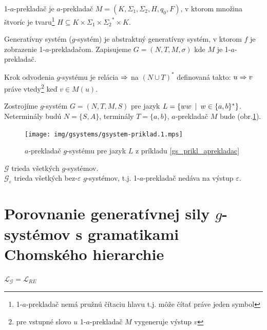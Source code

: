 \begin{definicia}
1-$a$-prekladač je $a$-prekladač
$M=(K,\Sigma_1,\Sigma_2,H,q_0,F)$, v ktorom množina štvoríc je
tvaru\footnote{1-$a$-prekladač nemá pružnú čítaciu hlavu t.j. môže
čítať práve jeden symbol} $H\subseteq K\times\Sigma_1\times
{\Sigma_2}^* \times K$.
\end{definicia}

\begin{definicia}
Generatívny systém ($g$-systém) je abstraktný generatívny systém,
v ktorom $f$ je zobrazenie 1-$a$-prekladačom. Zapisujeme
$G=(N,T,M,\sigma)$ kde $M$ je 1-$a$-prekladač.
\end{definicia}

\begin{definicia}
Krok odvodenia $g$-systému je relácia $\Rightarrow$ na $(N\cup T)^* $
definovaná takto: $u\Rightarrow v$ práve vtedy\footnote{pre vstupné slovo
$u$ 1-$a$-prekladač $M$ vygeneruje výstup $v$} keď $v\in M(u)$.
\end{definicia}

\begin{priklad}
\label{gs_prikl_aprekladac} Zostrojíme $g$-systém  $G=(N,T,M,S)$ pre jazyk
$L=\{ww\enspace |\enspace w\in\{a,b\}^*\}$. Neterminály budú $N=\{S,A\}$,
terminály $T=\{a,b\}$, $a$-prekladač $M$ bude (obr.\ref{fig:gsystem-priklad}).
\begin{figure}[!ht]
  \centering
  \texttt{[image: img/gsystems/gsystem-priklad.1.mps]}
  \caption{$a$-prekladač $g$-systému pre jazyk $L$ z príkladu
    \ref{gs_prikl_aprekladac}}
  \label{fig:gsystem-priklad}
\end{figure}
\end{priklad}

\begin{oznacenie}
$\mathcal{G}$  trieda všetkých $g$-systémov. \\
$\mathcal{G_\varepsilon}$ trieda všetkých bez-$\varepsilon$
$g$-systémov, t.j. 1-$a$-prekladač nedáva na výstup $\varepsilon$.
\end{oznacenie}

\section{Porovnanie generatívnej sily $g$-systémov s gramatikami Chomského hierarchie}

\begin{veta}
\label{gs_veta_gre} $\mathcal{L}_{\mathcal{G}}=\mathcal{L}_{RE}$
\end{veta}

